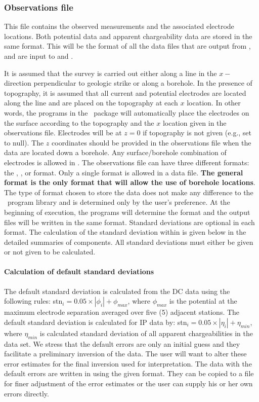 \subsubsection{Observations file}

This file contains the observed measurements and the associated electrode locations. Both potential data and apparent chargeability data are stored in the same format. This will be the format of all the data files that are output from , and are input to  and .

It is assumed that the survey is carried out either along a line in the $x-$direction perpendicular to geologic strike or along a borehole. In the presence of topography, it is assumed that all current and potential electrodes are located along the line and are placed on the topography at each $x$ location. In other words, the programs in the \prog~package will automatically place the electrodes on the surface according to the topography and the $x$ location given in the observations file. Electrodes will be at $z=0$ if topography is not given (e.g., set to null). The $z$ coordinates should be provided in the observations file when the data are located down a borehole. Any surface/borehole combination of electrodes is allowed in \programName. The observations file can have three different formats: the , , or  format. Only a single format is allowed in a data file. \textbf{The general format is the only format that will allow the use of borehole locations}. The type of format chosen to store the data does not make any difference to the \prog~program library and is determined only by the user's preference. At the beginning of execution, the programs will determine the format and the output files will be written in the same format. Standard deviations are optional in each format. The calculation of the standard deviation within  is given below in the detailed summaries of components. All standard deviations must either be given or not given to be calculated. 

\paragraph{Calculation of default standard deviations} The default standard deviation is calculated from the DC data using the following rules: stn$_i = 0.05 \times |\phi_i| + \phi_{max}$, where $\phi_{max}$ is the potential at the maximum electrode separation averaged over five (5) adjacent stations. The default standard deviation is calculated for IP data by: stn$_i = 0.05 \times |\eta_i| + \eta_{min}$, where $\eta_{min}$ is calculated standard deviation of all apparent chargeabilities in the data set. We stress that the default errors are only an initial guess and they facilitate a preliminary inversion of the data. The user will want to alter these error estimates for the final inversion used for interpretation. The data with the default errors are written in  using the given format. They can be copied to a file for finer adjustment of the error estimates or the user can supply his or her own errors directly. 

